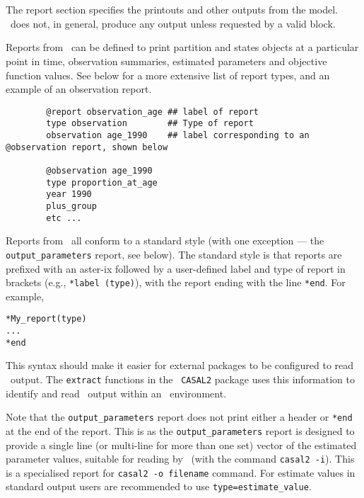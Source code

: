 \section{\label{sec:report-section}}
The report section specifies the printouts and other outputs from the model. \CNAME\ does not, in general, produce any output unless requested by a valid  block. 

Reports from \CNAME\ can be defined to print partition and states objects at a particular point in time, observation summaries, estimated parameters and objective function values. See below for a more extensive list of report types, and an example of an observation report.

{\small{\begin{verbatim}
		@report observation_age ## label of report
		type observation		## Type of report
		observation age_1990	## label corresponding to an @observation report, shown below
		
		@observation age_1990
		type proportion_at_age
		year 1990
		plus_group
		etc ...
		\end{verbatim}}}
\textsl{}
Reports from \CNAME\ all conform to a standard style (with one exception --- the \texttt{output\_parameters} report, see below). The standard style is that reports are prefixed with an aster-ix followed by a user-defined label and type of report in brackets (e.g., \texttt{*label (type)}), with the report ending with the line \texttt{*end}. For example,

\begin{verbatim} 
*My_report(type)
...
*end
\end{verbatim}


This syntax should make it easier for external packages to be configured to read \CNAME\ output. The \texttt{extract} functions in the \R\ \texttt{CASAL2} package uses this information to identify and read \CNAME\ output within an \R\ environment.

Note that the \texttt{output\_parameters} report does not print either a header or \texttt{*end} at the end of the report. This is as the \texttt{output\_parameters} report is designed to provide a single line (or multi-line for more than one set) vector of the estimated parameter values, suitable for reading by \CNAME\ (with the command \texttt{casal2 -i}). This is a specialised report for \texttt{casal2 -o filename} command. For estimate values in standard output users are recommended to use \texttt{type=estimate\_value}.

